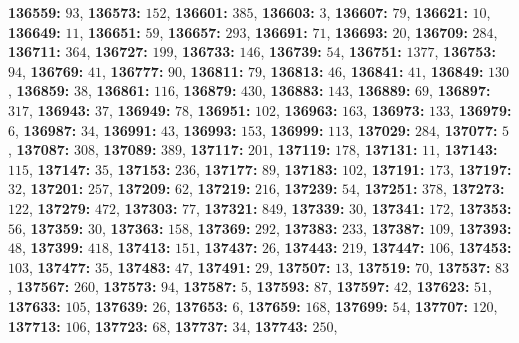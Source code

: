 \textsf{\bfseries 136559:} $93$, \textsf{\bfseries 136573:} $152$, \textsf{\bfseries 136601:} $385$, \textsf{\bfseries 136603:} $3$, \textsf{\bfseries 136607:} $79$, \textsf{\bfseries 136621:} $10$, \textsf{\bfseries 136649:} $11$, \textsf{\bfseries 136651:} $59$, \textsf{\bfseries 136657:} $293$, \textsf{\bfseries 136691:} $71$, \textsf{\bfseries 136693:} $20$, \textsf{\bfseries 136709:} $284$, \textsf{\bfseries 136711:} $364$, \textsf{\bfseries 136727:} $199$, \textsf{\bfseries 136733:} $146$, \textsf{\bfseries 136739:} $54$, \textsf{\bfseries 136751:} $1377$, \textsf{\bfseries 136753:} $94$, \textsf{\bfseries 136769:} $41$, \textsf{\bfseries 136777:} $90$, \textsf{\bfseries 136811:} $79$, \textsf{\bfseries 136813:} $46$, \textsf{\bfseries 136841:} $41$, \textsf{\bfseries 136849:} $130$, \textsf{\bfseries 136859:} $38$, \textsf{\bfseries 136861:} $116$, \textsf{\bfseries 136879:} $430$, \textsf{\bfseries 136883:} $143$, \textsf{\bfseries 136889:} $69$, \textsf{\bfseries 136897:} $317$, \textsf{\bfseries 136943:} $37$, \textsf{\bfseries 136949:} $78$, \textsf{\bfseries 136951:} $102$, \textsf{\bfseries 136963:} $163$, \textsf{\bfseries 136973:} $133$, \textsf{\bfseries 136979:} $6$, \textsf{\bfseries 136987:} $34$, \textsf{\bfseries 136991:} $43$, \textsf{\bfseries 136993:} $153$, \textsf{\bfseries 136999:} $113$, \textsf{\bfseries 137029:} $284$, \textsf{\bfseries 137077:} $5$, \textsf{\bfseries 137087:} $308$, \textsf{\bfseries 137089:} $389$, \textsf{\bfseries 137117:} $201$, \textsf{\bfseries 137119:} $178$, \textsf{\bfseries 137131:} $11$, \textsf{\bfseries 137143:} $115$, \textsf{\bfseries 137147:} $35$, \textsf{\bfseries 137153:} $236$, \textsf{\bfseries 137177:} $89$, \textsf{\bfseries 137183:} $102$, \textsf{\bfseries 137191:} $173$, \textsf{\bfseries 137197:} $32$, \textsf{\bfseries 137201:} $257$, \textsf{\bfseries 137209:} $62$, \textsf{\bfseries 137219:} $216$, \textsf{\bfseries 137239:} $54$, \textsf{\bfseries 137251:} $378$, \textsf{\bfseries 137273:} $122$, \textsf{\bfseries 137279:} $472$, \textsf{\bfseries 137303:} $77$, \textsf{\bfseries 137321:} $849$, \textsf{\bfseries 137339:} $30$, \textsf{\bfseries 137341:} $172$, \textsf{\bfseries 137353:} $56$, \textsf{\bfseries 137359:} $30$, \textsf{\bfseries 137363:} $158$, \textsf{\bfseries 137369:} $292$, \textsf{\bfseries 137383:} $233$, \textsf{\bfseries 137387:} $109$, \textsf{\bfseries 137393:} $48$, \textsf{\bfseries 137399:} $418$, \textsf{\bfseries 137413:} $151$, \textsf{\bfseries 137437:} $26$, \textsf{\bfseries 137443:} $219$, \textsf{\bfseries 137447:} $106$, \textsf{\bfseries 137453:} $103$, \textsf{\bfseries 137477:} $35$, \textsf{\bfseries 137483:} $47$, \textsf{\bfseries 137491:} $29$, \textsf{\bfseries 137507:} $13$, \textsf{\bfseries 137519:} $70$, \textsf{\bfseries 137537:} $83$, \textsf{\bfseries 137567:} $260$, \textsf{\bfseries 137573:} $94$, \textsf{\bfseries 137587:} $5$, \textsf{\bfseries 137593:} $87$, \textsf{\bfseries 137597:} $42$, \textsf{\bfseries 137623:} $51$, \textsf{\bfseries 137633:} $105$, \textsf{\bfseries 137639:} $26$, \textsf{\bfseries 137653:} $6$, \textsf{\bfseries 137659:} $168$, \textsf{\bfseries 137699:} $54$, \textsf{\bfseries 137707:} $120$, \textsf{\bfseries 137713:} $106$, \textsf{\bfseries 137723:} $68$, \textsf{\bfseries 137737:} $34$, \textsf{\bfseries 137743:} $250$, 
